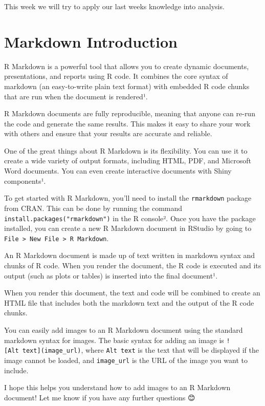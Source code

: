 \documentclass[
]{book}
\begin{document}
This week we will try to apply our last weeks knowledge into analysis.

\hypertarget{markdown-introduction}{%
\section{Markdown Introduction}\label{markdown-introduction}}

R Markdown is a powerful tool that allows you to create dynamic documents, presentations, and reports using R code. It combines the core syntax of markdown (an easy-to-write plain text format) with embedded R code chunks that are run when the document is rendered¹.

R Markdown documents are fully reproducible, meaning that anyone can re-run the code and generate the same results. This makes it easy to share your work with others and ensure that your results are accurate and reliable.

One of the great things about R Markdown is its flexibility. You can use it to create a wide variety of output formats, including HTML, PDF, and Microsoft Word documents. You can even create interactive documents with Shiny components¹.

To get started with R Markdown, you'll need to install the \texttt{rmarkdown} package from CRAN. This can be done by running the command \texttt{install.packages("rmarkdown")} in the R console². Once you have the package installed, you can create a new R Markdown document in RStudio by going to \texttt{File\ \textgreater{}\ New\ File\ \textgreater{}\ R\ Markdown}.

An R Markdown document is made up of text written in markdown syntax and chunks of R code. When you render the document, the R code is executed and its output (such as plots or tables) is inserted into the final document¹.

When you render this document, the text and code will be combined to create an HTML file that includes both the markdown text and the output of the R code chunks.

You can easily add images to an R Markdown document using the standard markdown syntax for images. The basic syntax for adding an image is \texttt{!{[}Alt\ text{]}(image\_url)}, where \texttt{Alt\ text} is the text that will be displayed if the image cannot be loaded, and \texttt{image\_url} is the URL of the image you want to include.

I hope this helps you understand how to add images to an R Markdown document! Let me know if you have any further questions 😊
\end{document}
